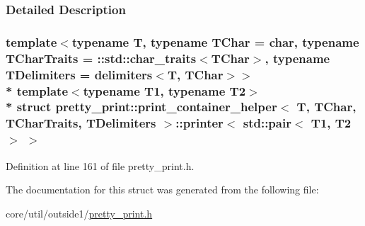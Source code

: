 \subsubsection{Detailed Description}
\subsubsection*{template$<$typename T, typename T\+Char = char, typename T\+Char\+Traits = \+::std\+::char\+\_\+traits$<$\+T\+Char$>$, typename T\+Delimiters = delimiters$<$\+T, T\+Char$>$$>$\\*
template$<$typename T1, typename T2$>$\\*
struct pretty\+\_\+print\+::print\+\_\+container\+\_\+helper$<$ T, T\+Char, T\+Char\+Traits, T\+Delimiters $>$\+::printer$<$ std\+::pair$<$ T1, T2 $>$ $>$}



Definition at line 161 of file pretty\+\_\+print.\+h.



The documentation for this struct was generated from the following file\+:\begin{DoxyCompactItemize}
\item 
core/util/outside1/\hyperlink{pretty__print_8h}{pretty\+\_\+print.\+h}\end{DoxyCompactItemize}
